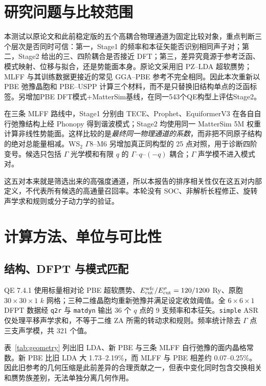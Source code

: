\documentclass[UTF8,a4paper,11pt,fontset=mac]{ctexart}
\begin{document}
\tableofcontents
\clearpage

\section{研究问题与比较范围}

本测试以原论文和此前稳定版的五个高耦合物理通道为固定比较对象，重点判断三个层次是否同时可信：第一，Stage1 的频率和本征矢能否识别相同声子对；第二，Stage2 给出的三、四阶耦合是否接近 DFT；第三，差异究竟源于参考泛函、模式映射、位移与拟合，还是势能面本身。原论文采用旧 PZ--LDA 超软赝势；MLFF 与其训练数据更接近的常见 GGA--PBE 参考不完全相同。因此本次重新以 PBE 弛豫晶胞和 PBE--USPP 计算三个材料，而不是只替换旧结构单点的泛函标签。另增加PBE DFT模式+MatterSim基线，在同一543个QE构型上评估Stage2。

在三条 MLFF 路线中，Stage1 分别由 TECE、Prophet、EquiformerV3 在各自自行弛豫结构上经 Phonopy 得到谐波模式；Stage2 均使用同一 MatterSim 5M 权重计算非线性势能面。这样比较的是\emph{最终同一物理通道的系数}，而非把不同原子结构的绝对总能量相减。WS$_2$ $\Gamma8$--M6 另增加真正同构型的 25 点对照，用于诊断四阶变号。候选只包括 $\Gamma$ 光学模和有限 $q$ 的 $\Gamma$--$q$--$(-q)$ 耦合；$\Gamma$ 声学模不进入模式对。

这五对本来就是筛选出来的高强度通道，所以本报告的排序相关性仅在这五对内部定义，不代表所有候选的高通量召回率。本轮没有 SOC、非解析长程修正、旋转声学求和规则或分子动力学的验证。

\section{计算方法、单位与可比性}

\subsection{结构、DFPT 与模式匹配}

QE 7.4.1 使用标量相对论 PBE 超软赝势、$E_{\rm cut}^{\rm wfc}/E_{\rm cut}^{\rho}=120/1200$ Ry、原胞 $30\times30\times1$ $k$ 网格；三种二维晶胞均重新弛豫并满足设定收敛阈值。全 $6\times6\times1$ DFPT 数据经 \texttt{q2r} 与 \texttt{matdyn} 输出 36 个 $q$ 点的 9 支频率和本征矢。\texttt{simple} ASR 仅处理平移声学求和，不等于二维 ZA 所需的转动求和规则。频率统计除去 $\Gamma$ 点三支声学模，共 321 个值。

表~\ref{tab:geometry} 列出旧 LDA、新 PBE 与三条 MLFF 自行弛豫的面内晶格常数。新 PBE 比旧 LDA 大 1.73--2.19\%，而 MLFF 与 PBE 相差约 0.07--0.25\%。因此旧参考的几何压缩是此前差异的合理贡献之一，但表中变化同时包含交换相关和赝势族差别，无法单独分离几何作用。
\end{document}
